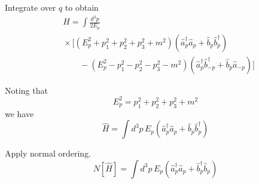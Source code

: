 \documentclass[12pt]{article}
\begin{document}
Integrate over $q$ to obtain
\begin{align*}
&\hat H=\int\frac{d^3p}{2E_p}
\\
&{}\times\bigg[(E_p^2+p_1^2+p_2^2+p_3^2+m^2)
\left(\hat a_p^\dag\hat a_p+\hat b_p\hat b_p^\dag\right)
\\
&\qquad{}-(E_p^2-p_1^2-p_2^2-p_3^2-m^2)
\left(\hat a_p^\dag\hat b_{-p}^\dag+\hat b_p\hat a_{-p}\right)\bigg]
\end{align*}

Noting that
\begin{equation*}
E_p^2=p_1^2+p_2^2+p_3^2+m^2
\end{equation*}
we have
\begin{equation*}
\hat H=\int d^3p\,E_p\left(\hat a_p^\dag\hat a_p+\hat b_p\hat b_p^\dag\right)
\end{equation*}

Apply normal ordering.
\begin{equation*}
N[\hat H]=\int d^3p\,E_p\left(\hat a_p^\dag\hat a_p+\hat b_p^\dag\hat b_p\right)
\end{equation*}
\end{document}
